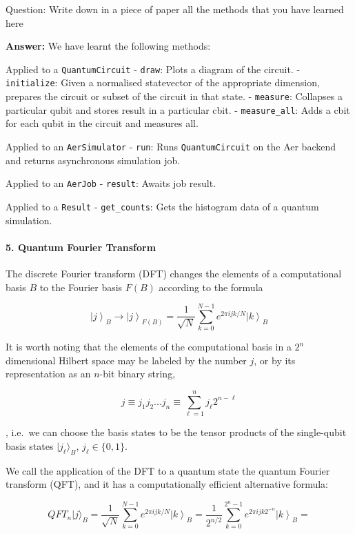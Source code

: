 \documentclass[11pt]{article}
\begin{document}
    Question: Write down in a piece of paper all the methods that you have
learned here

    \textbf{Answer:} We have learnt the following methods:

Applied to a \texttt{QuantumCircuit} - \texttt{draw}: Plots a diagram of
the circuit. - \texttt{initialize}: Given a normalised statevector of
the appropriate dimension, prepares the circuit or subset of the circuit
in that state. - \texttt{measure}: Collapses a particular qubit and
stores result in a particular cbit. - \texttt{measure\_all}: Adds a cbit
for each qubit in the circuit and measures all.

Applied to an \texttt{AerSimulator} - \texttt{run}: Runs
\texttt{QuantumCircuit} on the Aer backend and returns asynchronous
simulation job.

Applied to an \texttt{AerJob} - \texttt{result}: Awaits job result.

Applied to a \texttt{Result} - \texttt{get\_counts}: Gets the histogram
data of a quantum simulation.

    \paragraph{\texorpdfstring{\textbf{5. Quantum Fourier
Transform}}{5. Quantum Fourier Transform}}\label{quantum-fourier-transform}

    The discrete Fourier transform (DFT) changes the elements of a
computational basis \(B\) to the Fourier basis \(F(B)\) according to the
formula

\[
\left|j\right\rangle_{B}\rightarrow \left|j\right\rangle_{F(B)} =  \frac{1}{\sqrt{N}}\sum^{N-1}_{k=0} e^{2\pi i j k /N}\left|k\right\rangle_{B}
\]

It is worth noting that the elements of the computational basis in a
\(2^n\) dimensional Hilbert space may be labeled by the number \(j\), or
by its representation as an \(n\)-bit binary string,

\[
j \equiv j_1 j_2 ... j_n \equiv \sum\limits_{\ell=1}^{n} j_\ell 2^{n-\ell}
\]

, i.e.~we can choose the basis states to be the tensor products of the
single-qubit basis states \(|j_\ell\rangle_B\), \(j_\ell\in\{0,1\}\).

We call the application of the DFT to a quantum state the quantum
Fourier transform (QFT), and it has a computationally efficient
alternative formula:

\[
QFT_n |j\rangle_{B} = \frac{1}{\sqrt{N}}\sum^{N-1}_{k=0} e^{2\pi i j k /N}\left|k\right\rangle_{B} = 
\frac{1}{2^{n/2}}\sum^{2^n-1}_{k=0} e^{2\pi i j k 2^{-n}}\left|k\right\rangle_{B} = 
\]
\end{document}
